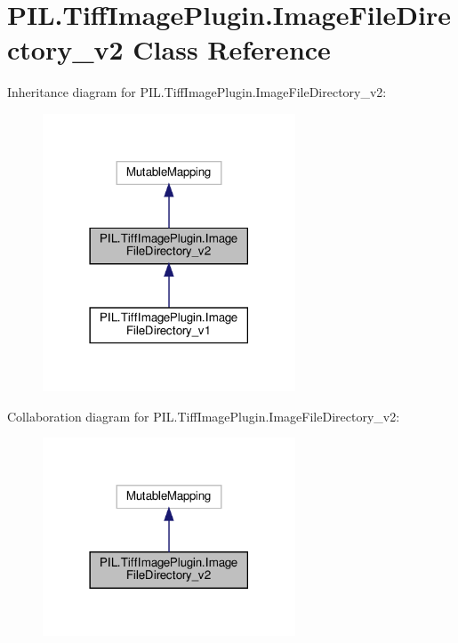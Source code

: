 \hypertarget{classPIL_1_1TiffImagePlugin_1_1ImageFileDirectory__v2}{}\section{P\+I\+L.\+Tiff\+Image\+Plugin.\+Image\+File\+Directory\+\_\+v2 Class Reference}
\label{classPIL_1_1TiffImagePlugin_1_1ImageFileDirectory__v2}


Inheritance diagram for P\+I\+L.\+Tiff\+Image\+Plugin.\+Image\+File\+Directory\+\_\+v2\+:
\nopagebreak
\begin{figure}[H]
\begin{center}
\leavevmode
\includegraphics[width=213pt]{classPIL_1_1TiffImagePlugin_1_1ImageFileDirectory__v2__inherit__graph}
\end{center}
\end{figure}


Collaboration diagram for P\+I\+L.\+Tiff\+Image\+Plugin.\+Image\+File\+Directory\+\_\+v2\+:
\nopagebreak
\begin{figure}[H]
\begin{center}
\leavevmode
\includegraphics[width=213pt]{classPIL_1_1TiffImagePlugin_1_1ImageFileDirectory__v2__coll__graph}
\end{center}
\end{figure}
